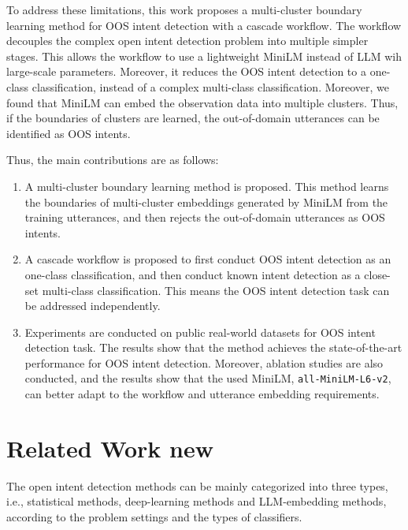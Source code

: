 \documentclass[11pt]{article}
\begin{document}
To address these limitations, this work proposes a multi-cluster boundary learning method for OOS intent detection with a cascade workflow. The workflow decouples the complex open intent detection problem into multiple simpler stages. This allows the workflow to use a lightweight MiniLM instead of LLM wih large-scale parameters. Moreover, it reduces the OOS intent detection to a one-class classification, instead of a complex multi-class classification. Moreover, we found that MiniLM can embed the observation data into multiple clusters. Thus, if the boundaries of clusters are learned, the out-of-domain utterances can be identified as OOS intents.

Thus, the main contributions are as follows:
\begin{enumerate}
    \item[1.] A multi-cluster boundary learning method is proposed. This method learns the boundaries of multi-cluster embeddings generated by MiniLM from the training utterances, and then rejects the out-of-domain utterances as OOS intents. 
    
    \item[2.] A cascade workflow is proposed to first conduct OOS intent detection as an one-class classification, and then conduct known intent detection as a close-set multi-class classification. This means the OOS intent detection task can be addressed independently. 

    \item[3] Experiments are conducted on public real-world datasets for OOS intent detection task. The results show that the method achieves the state-of-the-art performance for OOS intent detection. Moreover, ablation studies are also conducted, and the results show that the used MiniLM, \texttt{all-MiniLM-L6-v2}, can better adapt to the workflow and utterance embedding requirements.  
\end{enumerate}


\section{Related Work new}
The open intent detection methods can be mainly categorized into three types, i.e., statistical methods, deep-learning methods and LLM-embedding methods, according to the problem settings and the types of classifiers.   
\end{document}
